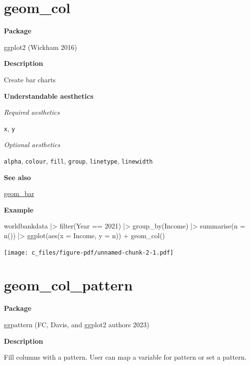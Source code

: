 \documentclass[
  letterpaper,
  DIV=11,
  numbers=noendperiod]{scrreprt}
\newenvironment{Shaded}{\begin{snugshade}}{\end{snugshade}}
\newcommand{\AttributeTok}[1]{\textcolor[rgb]{0.40,0.45,0.13}{#1}}
\newcommand{\DecValTok}[1]{\textcolor[rgb]{0.68,0.00,0.00}{#1}}
\newcommand{\FunctionTok}[1]{\textcolor[rgb]{0.28,0.35,0.67}{#1}}
\newcommand{\NormalTok}[1]{\textcolor[rgb]{0.00,0.23,0.31}{#1}}
\newcommand{\SpecialCharTok}[1]{\textcolor[rgb]{0.37,0.37,0.37}{#1}}
\begin{document}
\section{geom\_col}\label{geom_col}

\textbf{Package}

ggplot2 (Wickham 2016)

\textbf{Description}

Create bar charts

\textbf{Understandable aesthetics}

\emph{Required aesthetics}

\texttt{x}, \texttt{y}

\emph{Optional aesthetics}

\texttt{alpha}, \texttt{colour}, \texttt{fill}, \texttt{group},
\texttt{linetype}, \texttt{linewidth}

\textbf{See also}

\hyperref[bar]{geom\_bar}

\textbf{Example}

\begin{Shaded}
\begin{Highlighting}[]
\NormalTok{worldbankdata }\SpecialCharTok{|\textgreater{}}
  \FunctionTok{filter}\NormalTok{(Year }\SpecialCharTok{==} \DecValTok{2021}\NormalTok{) }\SpecialCharTok{|\textgreater{}}
  \FunctionTok{group\_by}\NormalTok{(Income) }\SpecialCharTok{|\textgreater{}}
  \FunctionTok{summarise}\NormalTok{(}\AttributeTok{n =} \FunctionTok{n}\NormalTok{()) }\SpecialCharTok{|\textgreater{}}
  \FunctionTok{ggplot}\NormalTok{(}\FunctionTok{aes}\NormalTok{(}\AttributeTok{x =}\NormalTok{ Income, }\AttributeTok{y =}\NormalTok{ n)) }\SpecialCharTok{+}   \FunctionTok{geom\_col}\NormalTok{()}
\end{Highlighting}
\end{Shaded}

\texttt{[image: c\_files/figure-pdf/unnamed-chunk-2-1.pdf]}

\section{geom\_col\_pattern}\label{col_pattern}

\textbf{Package}

ggpattern (FC, Davis, and ggplot2 authors 2023)

\textbf{Description}

Fill columns with a pattern. User can map a variable for pattern or set
a pattern.
\end{document}
